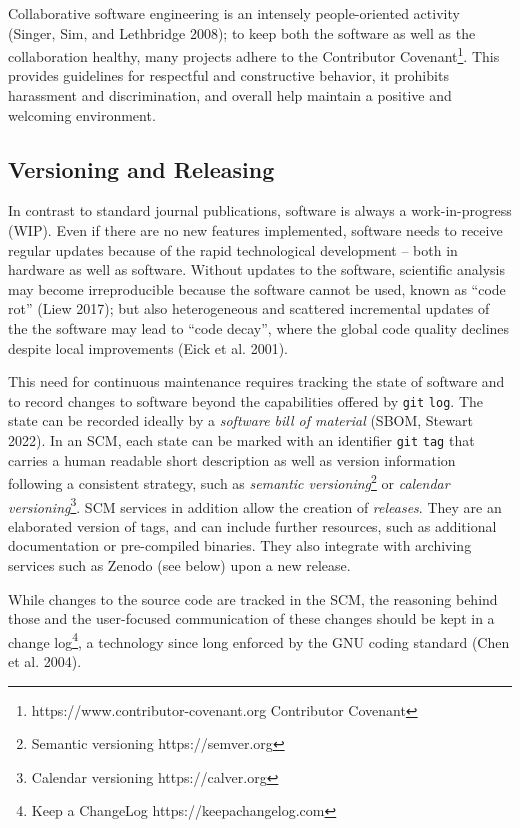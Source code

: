 \documentclass[preprint,11pt,5p]{elsarticle}
\begin{document}
Collaborative software engineering is an intensely people-oriented
activity (Singer, Sim, and Lethbridge 2008); to keep both the software
as well as the collaboration healthy, many projects adhere to the
Contributor Covenant\footnote{https://www.contributor-covenant.org
  Contributor Covenant}. This provides guidelines for respectful and
constructive behavior, it prohibits harassment and discrimination, and
overall help maintain a positive and welcoming environment.

\subsection{Versioning and Releasing}\label{versioning-and-releasing}

In contrast to standard journal publications, software is always a
work-in-progress (WIP). Even if there are no new features implemented,
software needs to receive regular updates because of the rapid
technological development -- both in hardware as well as software.
Without updates to the software, scientific analysis may become
irreproducible because the software cannot be used, known as ``code
rot'' (Liew 2017); but also heterogeneous and scattered incremental
updates of the the software may lead to ``code decay'', where the global
code quality declines despite local improvements (Eick et al. 2001).

This need for continuous maintenance requires tracking the state of
software and to record changes to software beyond the capabilities
offered by \texttt{git} \texttt{log}. The state can be recorded ideally
by a \emph{software bill of material} (SBOM, Stewart 2022). In an SCM,
each state can be marked with an identifier \texttt{git} \texttt{tag}
that carries a human readable short description as well as version
information following a consistent strategy, such as \emph{semantic
versioning}\footnote{Semantic versioning https://semver.org} or
\emph{calendar versioning}\footnote{Calendar versioning
  https://calver.org}. SCM services in addition allow the creation of
\emph{releases}. They are an elaborated version of tags, and can include
further resources, such as additional documentation or pre-compiled
binaries. They also integrate with archiving services such as Zenodo
(see below) upon a new release.

While changes to the source code are tracked in the SCM, the reasoning
behind those and the user-focused communication of these changes should
be kept in a change log\footnote{Keep a ChangeLog
  https://keepachangelog.com}, a technology since long enforced by the
GNU coding standard (Chen et al. 2004).
\end{document}
